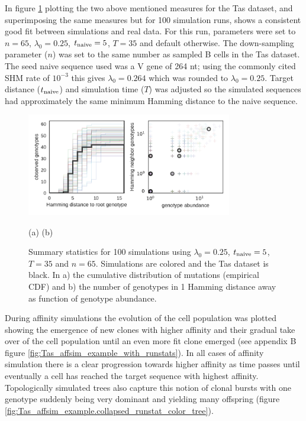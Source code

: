 In figure \ref{fig:Tas-affsim_Tas-data} plotting the two above mentioned measures for the Tas dataset, and superimposing the same measures but for 100 simulation runs, shows a consistent good fit between simulations and real data.
For this run, parameters were set to $n=65$, $\lambda_0=0.25$, $t_{\text{naive}}=5$, $T=35$ and default otherwise.
The down-sampling parameter ($n$) was set to the same number as sampled B cells in the Tas dataset.
The seed naive sequence used was a V gene of 264 nt; using the commonly cited SHM rate of $10^{-3}$ \cite{victora2012germinal} this gives $\lambda_0=0.264$ which was rounded to $\lambda_0=0.25$.
Target distance ($t_{\text{naive}}$) and simulation time ($T$) was adjusted so the simulated sequences had approximately the same minimum Hamming distance to the naive sequence.

\begin{figure}
    \begin{center}
    \includegraphics[width=0.8\textwidth]{figures/Tas-affsim_Tas-data.pdf}\newline%
    \end{center}
    \vspace{-14mm} \hspace{42mm} (a) \hspace{52mm} (b)
    \caption{
        \label{fig:Tas-affsim_Tas-data}
        Summary statistics for 100 simulations using $\lambda_0=0.25$, $t_{\text{naive}}=5$, $T=35$ and $n=65$.
        Simulations are colored and the Tas dataset is black.
        In a) the cumulative distribution of mutations (empirical CDF) and b) the number of genotypes in 1 Hamming distance away as function of genotype abundance.
    }
\end{figure}


During affinity simulations the evolution of the cell population was plotted showing the emergence of new clones with higher affinity and their gradual take over of the cell population until an even more fit clone emerged (see appendix B figure \ref{fig:Tas_affsim_example_with_runstats}).
In all cases of affinity simulation there is a clear progression towards higher affinity as time passes until eventually a cell has reached the target sequence with highest affinity.
Topologically simulated trees also capture this notion of clonal bursts with one genotype suddenly being very dominant and yielding many offspring (figure \ref{fig:Tas_affsim_example.collapsed_runstat_color_tree}).

